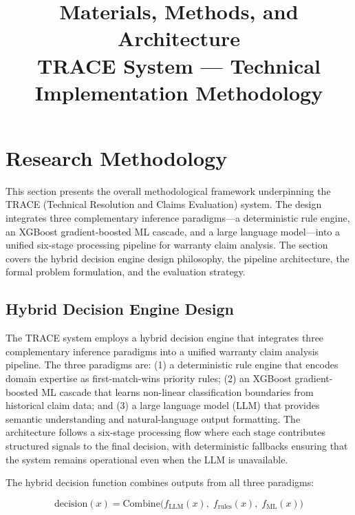 \documentclass[10pt,a4paper]{article}
\title{\textbf{Materials, Methods, and Architecture}\\[0.3em]
\large TRACE System --- Technical Implementation Methodology}
\author{}
\date{}
\begin{document}
\maketitle
\tableofcontents
\newpage


\section{Research Methodology}
\label{sec:research-methodology}

This section presents the overall methodological framework underpinning the TRACE (Technical Resolution and Claims Evaluation) system. The design integrates three complementary inference paradigms---a deterministic rule engine, an XGBoost gradient-boosted ML cascade, and a large language model---into a unified six-stage processing pipeline for warranty claim analysis. The section covers the hybrid decision engine design philosophy, the pipeline architecture, the formal problem formulation, and the evaluation strategy.

\subsection{Hybrid Decision Engine Design}
\label{sec:hybrid-decision-engine-design}

The TRACE system employs a hybrid decision engine that integrates three complementary inference paradigms into a unified warranty claim analysis pipeline. The three paradigms are: (1) a deterministic rule engine that encodes domain expertise as first-match-wins priority rules; (2) an XGBoost gradient-boosted ML cascade that learns non-linear classification boundaries from historical claim data; and (3) a large language model (LLM) that provides semantic understanding and natural-language output formatting. The architecture follows a six-stage processing flow where each stage contributes structured signals to the final decision, with deterministic fallbacks ensuring that the system remains operational even when the LLM is unavailable.

The hybrid decision function combines outputs from all three paradigms:

\begin{equation}
\text{decision}(x) = \text{Combine}\big(f_{\text{LLM}}(x),\; f_{\text{rules}}(x),\; f_{\text{ML}}(x)\big)
\label{eq:hybrid-decision}
\end{equation}
\end{document}
